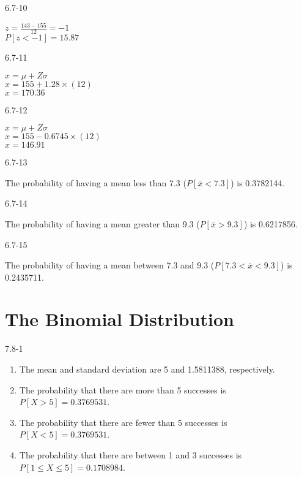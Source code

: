 \begin{exsol@solution}{6.7-10}

	    $z = \frac{143 - 155}{12} = -1$ \\
	    $P[z < -1] = 15.87$

\end{exsol@solution}
\begin{exsol@solution}{6.7-11}

	    $x = \mu + Z \sigma$ \\
	    $x = 155 + 1.28 \times (12) $ \\
	    $x = 170.36$

\end{exsol@solution}
\begin{exsol@solution}{6.7-12}

	    $x = \mu + Z \sigma$ \\
	    $x = 155 - 0.6745 \times (12) $ \\
	    $x = 146.91$

\end{exsol@solution}
\begin{exsol@solution}{6.7-13}



    The probability of having a mean less than 7.3 ($P[ \bar{x} < 7.3 ]$) is 0.3782144.

\end{exsol@solution}
\begin{exsol@solution}{6.7-14}



    The probability of having a mean greater than 9.3 ($P[ \bar{x} > 9.3 ]$) is 0.6217856.

\end{exsol@solution}
\begin{exsol@solution}{6.7-15}



    The probability of having a mean between 7.3 and  9.3 ($P[ 7.3 < \bar{x} < 9.3 ]$) is 0.2435711.

\end{exsol@solution}
\setcounter{chapter}{6}\chapter{The Binomial Distribution}
\begin{exsol@solution}{7.8-1}

		\begin{enumerate}
	  \item The mean and standard deviation are 5 and 1.5811388, respectively.
    \item The probability that there are more than 5 successes is $P[ X > 5 ] = 0.3769531$.
    \item The probability that there are fewer than 5 successes is $P[ X < 5 ] = 0.3769531$.
    \item The probability that there  are between 1 and 3 successes  is $P[ 1 \le X \le 5 ] = 0.1708984$.
	  \end{enumerate}
\end{exsol@solution}

